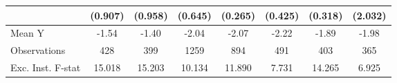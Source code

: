 {\begin{tabular}{l*{7}{c}}
            &     (0.907)         &     (0.958)         &     (0.645)         &     (0.265)         &     (0.425)         &     (0.318)         &     (2.032)         \\
\midrule
Mean Y      &       -1.54         &       -1.40         &       -2.04         &       -2.07         &       -2.22         &       -1.89         &       -1.98         \\
Observations&         428         &         399         &        1259         &         894         &         491         &         403         &         365         \\
Exc. Inst. F-stat&      15.018         &      15.203         &      10.134         &      11.890         &       7.731         &      14.265         &       6.925         \\
\bottomrule
\end{tabular}
}
